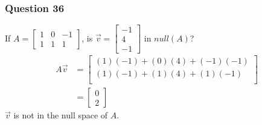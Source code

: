 \documentclass{math}
\begin{document}
\subsubsection*{Question 36}
If \( A = \begin{bmatrix}1 & 0 & -1 \\ 1 & 1 & 1\end{bmatrix} \), is
\( \vec{v} = \begin{bmatrix}-1 \\ 4 \\ -1\end{bmatrix} \) in \( null(A) \)?
\begin{align*}
  A\vec{v} &= \begin{bmatrix}
    (1)(-1)+(0)(4)+(-1)(-1) \\
    (1)(-1)+(1)(4)+(1)(-1) \\
  \end{bmatrix} \\
  &= \begin{bmatrix}
    0 \\ 2
  \end{bmatrix}
\end{align*}
\( \vec{v} \) is not in the null space of \( A \).
\end{document}
